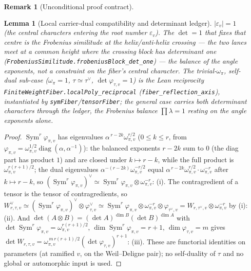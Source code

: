 \documentclass[11pt]{article}
\newtheorem{lemma}[theorem]{Lemma}
\theoremstyle{definition}
\newtheorem{remark}[theorem]{Remark}
\newcommand{\Sym}{\operatorname{Sym}}
\begin{document}
\begin{remark}[Unconditional proof contract]
\begin{enumerate}
\begin{lemma}[Local carrier-dual compatibility and determinant ledger]
$|\varepsilon_v|=1$ (the central characters entering the root number $\varepsilon_v$). The $\det=1$ that fixes
that centre is the \emph{Frobenius similitude at the helix/anti-helix crossing} --- the two lanes meet at a common
height where the crossing block has determinant one (\texttt{FrobeniusSimilitude.frobeniusBlock\_det\_one}) ---
the balance of the angle exponents, not a constraint on the fiber's central character. The trivial-$\omega_\pi$,
self-dual sub-case ($\omega_\pi=1$, $\tau\simeq\tau^\vee$, $\det\varphi_{\tau,v}=1$) is the Lean reciprocity
\texttt{FiniteWeightFiber.localPoly\_reciprocal} (\texttt{fiber\_reflection\_axis}), instantiated by
\texttt{symFiber}/\texttt{tensorFiber}; the general case carries both determinant characters through the ledger,
the Frobenius balance $\prod\lambda=1$ resting on the angle exponents alone.
\end{lemma}

\begin{proof}
$\Sym^r\varphi_{\pi,v}$ has eigenvalues $\alpha^{\,r-2k}\omega_{\pi,v}^{r/2}$ ($0\le k\le r$, from
$\varphi_{\pi,v}=\omega_{\pi,v}^{1/2}\operatorname{diag}(\alpha,\alpha^{-1})$): the balanced exponents $r-2k$ sum
to $0$ (the diag part has product $1$) and are closed under $k\mapsto r-k$, while the full product is
$\omega_{\pi,v}^{r(r+1)/2}$; the dual eigenvalues $\alpha^{-(r-2k)}\omega_{\pi,v}^{-r/2}$ equal
$\alpha^{\,r-2k}\omega_{\pi,v}^{r/2}\cdot\omega_{\pi,v}^{-r}$ after $k\mapsto r-k$, so
$(\Sym^r\varphi_{\pi,v})^\vee\simeq\Sym^r\varphi_{\pi,v}\otimes\omega_{\pi,v}^{-r}$: \textup{(i)}. The
contragredient of a tensor is the tensor of contragredients, so $W_{r,\tau,v}^\vee\simeq
(\Sym^r\varphi_{\pi,v})^\vee\otimes\varphi_{\tau,v}^\vee\simeq\Sym^r\varphi_{\pi,v}\otimes\omega_{\pi,v}^{-r}
\otimes\varphi_{\tau^\vee,v}=W_{r,\tau^\vee,v}\otimes\omega_{\pi,v}^{-r}$ by \textup{(i)}: \textup{(ii)}. And
$\det(A\otimes B)=(\det A)^{\dim B}(\det B)^{\dim A}$ with $\det\Sym^r\varphi_{\pi,v}=\omega_{\pi,v}^{r(r+1)/2}$,
$\dim\Sym^r\varphi_{\pi,v}=r+1$, $\dim\varphi_{\tau,v}=m$ gives
$\det W_{r,\tau,v}=\omega_{\pi,v}^{\,m\,r(r+1)/2}(\det\varphi_{\tau,v})^{r+1}$: \textup{(iii)}. These
are functorial identities on parameters (at ramified $v$, on the Weil--Deligne pair); no self-duality of
$\tau$ and no global or automorphic input is used.
\end{proof}


\end{enumerate}
\end{remark}
\end{document}

